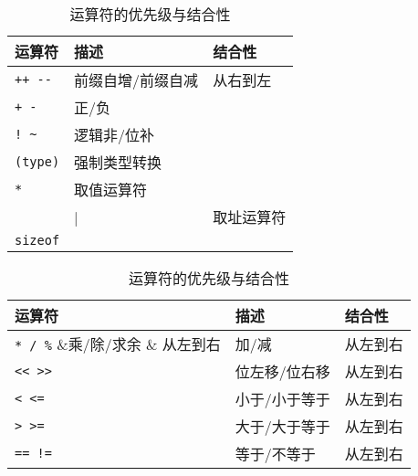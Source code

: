 \begin{frame}[fragile]\ft{\secname}  

\begin{table}[htbp]
  \centering 
  \caption{运算符的优先级与结合性}
  \begin{tabular}{l|l|l}\hline\hline
    运算符 & 描述 & 结合性 \\\hline    
    \lstinline|++ --| & 前缀自增/前缀自减& 从右到左 \\[.1in] 
    \lstinline|+ -| & 正/负 &\\[.1in]
    \lstinline|! ~| & 逻辑非/位补 &\\[.1in]
    \lstinline|(type)| & 强制类型转换 &\\[.1in]
    \lstinline|*| & 取值运算符&\\[.1in]
    \lstinline|&| & 取址运算符 & \\[.1in]
    \lstinline|sizeof| & &\\\hline
 \end{tabular}
\end{table}    
\end{frame}

\begin{frame}[fragile]\ft{\secname}  

\begin{table}[htbp]
  \centering 
  \caption{运算符的优先级与结合性}
  \begin{tabular}{l|l|l}\hline\hline
    运算符 & 描述 & 结合性 \\\hline    
    \lstinline|* / %| &乘/除/求余 & 从左到右\\\hline
    \lstinline|+ -| & 加/减 & 从左到右\\[.1in]\hline
    \lstinline|<< >>| & 位左移/位右移 & 从左到右\\[.1in]\hline
    \lstinline|< <=| & 小于/小于等于& 从左到右\\[.1in]
    \lstinline|> >=| & 大于/大于等于& 从左到右\\[.1in]\hline
    \lstinline|== !=| & 等于/不等于& 从左到右\\[.1in]\hline
 \end{tabular}
\end{table}    
\end{frame}

